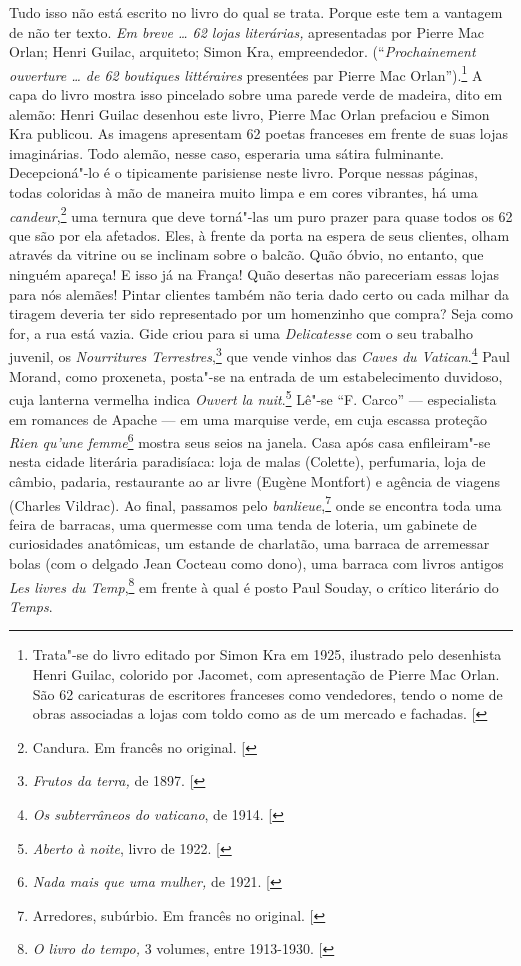 Tudo isso não está escrito no livro do qual se trata. Porque este tem
a vantagem de não ter texto. \emph{Em breve \ldots{} 62 lojas literárias,}
apresentadas por Pierre Mac Orlan; Henri Guilac, arquiteto; Simon Kra,
empreendedor. (``\emph{Prochainement ouverture \ldots{} de 62 boutiques
littéraires} presentées par Pierre Mac Orlan'').\footnote{Trata"-se do
  livro editado por Simon Kra em 1925, ilustrado pelo desenhista Henri
  Guilac, colorido por Jacomet, com apresentação de Pierre Mac Orlan.
  São 62 caricaturas de escritores franceses como vendedores, tendo o
  nome de obras associadas a lojas com toldo como as de um mercado e
  fachadas. {[}\versal{N. E.}{]}} A capa do livro mostra isso pincelado sobre uma
parede verde de madeira, dito em alemão: Henri Guilac desenhou este
livro, Pierre Mac Orlan prefaciou e Simon Kra publicou. As imagens
apresentam 62 poetas franceses em frente de suas lojas imaginárias. Todo
alemão, nesse caso, esperaria uma sátira fulminante. Decepcioná"-lo é o
tipicamente parisiense neste livro. Porque nessas páginas, todas
coloridas à mão de maneira muito limpa e em cores vibrantes, há uma
\emph{candeur},\footnote{Candura. Em francês no original. {[}\versal{N. E.}{]}}
uma ternura que deve torná"-las um puro prazer para quase todos os 62 que
são por ela afetados. Eles, à frente da porta na espera de seus
clientes, olham através da vitrine ou se inclinam sobre o balcão. Quão
óbvio, no entanto, que ninguém apareça! E isso já na França! Quão
desertas não pareceriam essas lojas para nós alemães! Pintar clientes
também não teria dado certo ou cada milhar da tiragem deveria ter sido
representado por um homenzinho que compra? Seja como for, a rua está
vazia. Gide criou para si uma \emph{Delicatesse} com o seu trabalho
juvenil, os \emph{Nourritures Terrestres},\footnote{\emph{Frutos da
  terra,} de 1897. {[}\versal{N. E.}{]}} que vende vinhos das \emph{Caves
du Vatican}.\footnote{\emph{Os subterrâneos do vaticano}, de 1914.
  {[}\versal{N. E.}{]}} Paul Morand, como proxeneta, posta"-se na entrada de um
estabelecimento duvidoso, cuja lanterna vermelha indica \emph{Ouvert la
nuit}.\footnote{\emph{Aberto à noite}, livro de 1922. {[}\versal{N.E.}{]}} Lê"-se
``F. Carco'' --- especialista em romances de Apache --- em uma marquise
verde, em cuja escassa proteção \emph{Rien qu'une femme}\footnote{\emph{Nada
  mais que uma mulher,} de 1921. {[}\versal{N. E.}{]}} mostra seus seios na
janela. Casa após casa enfileiram"-se nesta cidade literária paradisíaca:
loja de malas (Colette), perfumaria, loja de câmbio, padaria,
restaurante ao ar livre (Eugène Montfort) e agência de viagens (Charles
Vildrac). Ao final, passamos pelo \emph{banlieue},\footnote{Arredores,
  subúrbio. Em francês no original. {[}\versal{N. E.}{]}} onde se encontra toda
uma feira de barracas, uma quermesse com uma tenda de loteria, um
gabinete de curiosidades anatômicas, um estande de charlatão, uma
barraca de arremessar bolas (com o delgado Jean Cocteau como dono), uma
barraca com livros antigos \emph{Les livres du Temp},\footnote{\emph{O
  livro do tempo,} 3 volumes, entre 1913-1930. {[}\versal{N. E.}{]}} em frente à
qual é posto Paul Souday, o crítico literário do \emph{Temps}.

